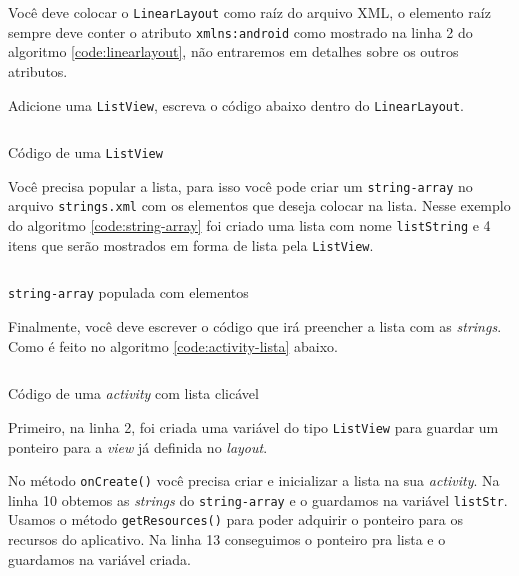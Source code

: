 \documentclass[a4paper,12pt,brazil]{book}
\begin{document}
\begin{singlespace}
Você deve colocar o \texttt{LinearLayout} como raíz do arquivo XML, o elemento raíz sempre deve conter o atributo \texttt{xmlns:android} como mostrado na linha 2 do algoritmo \ref{code:linearlayout}, não entraremos em detalhes sobre os outros atributos. 

Adicione uma \texttt{ListView}, escreva o código abaixo dentro do \texttt{LinearLayout}. 
\begin{listing}[H]
\inputminted[linenos=true,fontsize=\small,frame=lines, framesep=2mm, tabsize=2,numbersep=5pt]{xml}{src/design/listview.xml}
\caption{Código de uma \texttt{ListView}}
\end{listing}

Você precisa popular a lista, para isso você pode criar um \texttt{string-array} no arquivo \texttt{strings.xml} com os elementos que deseja colocar na lista. Nesse exemplo do algoritmo \ref{code:string-array} foi criado uma lista com nome \texttt{listString} e 4 itens que serão mostrados em forma de lista pela \texttt{ListView}.

\begin{listing}[H]
\inputminted[linenos=true,fontsize=\small,frame=lines, framesep=2mm, tabsize=2,numbersep=5pt]{xml}{src/design/string-array.xml}
\caption{\texttt{string-array} populada com elementos}
\label{code:string-array}
\end{listing}

Finalmente, você deve escrever o código que irá preencher a lista com as \emph{strings}. Como é feito no algoritmo \ref{code:activity-lista} abaixo.

\begin{listing}[H]
\inputminted[linenos=true,fontsize=\small,frame=lines, framesep=2mm, tabsize=2,numbersep=5pt]{java}{src/design/listactivity.java}
\caption{Código de uma \emph{activity} com lista clicável}
\label{code:activity-lista}
\end{listing}

Primeiro, na linha 2, foi criada uma variável do tipo \texttt{ListView} para guardar um ponteiro para a \emph{view} já definida no \emph{layout}.

No método \texttt{onCreate()} você precisa criar e inicializar a lista na sua \emph{activity}. Na linha 10 obtemos as \emph{strings} do \texttt{string-array} e o guardamos na variável \texttt{listStr}. Usamos o método \texttt{getResources()} para poder adquirir o ponteiro para os recursos do aplicativo. Na linha 13 conseguimos o ponteiro pra lista e o guardamos na variável criada.


\end{singlespace}
\end{document}
